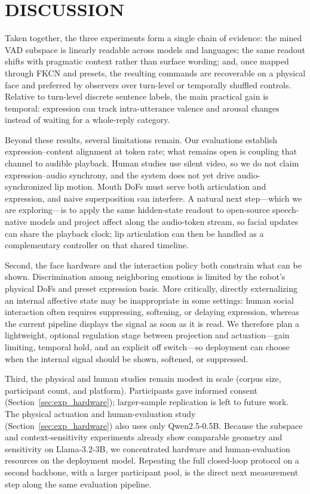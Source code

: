 \documentclass[letterpaper, 10 pt, conference]{ieeeconf/ieeeconf}
\begin{document}
\section{DISCUSSION}
\label{sec:discussion}

Taken together, the three experiments form a single chain of evidence: the mined VAD subspace is linearly readable across models and languages; the same readout shifts with pragmatic context rather than surface wording; and, once mapped through FKCN and presets, the resulting commands are recoverable on a physical face and preferred by observers over turn-level or temporally shuffled controls. Relative to turn-level discrete sentence labels, the main practical gain is temporal: expression can track intra-utterance valence and arousal changes instead of waiting for a whole-reply category.

Beyond these results, several limitations remain. Our evaluations establish expression--content alignment at token rate; what remains open is coupling that channel to audible playback. Human studies use silent video, so we do not claim expression--audio synchrony, and the system does not yet drive audio-synchronized lip motion. Mouth DoFs must serve both articulation and expression, and naive superposition can interfere. A natural next step---which we are exploring---is to apply the same hidden-state readout to open-source speech-native models and project affect along the audio-token stream, so facial updates can share the playback clock; lip articulation can then be handled as a complementary controller on that shared timeline.

Second, the face hardware and the interaction policy both constrain what can be shown. Discrimination among neighboring emotions is limited by the robot's physical DoFs and preset expression basis. More critically, directly externalizing an internal affective state may be inappropriate in some settings: human social interaction often requires suppressing, softening, or delaying expression, whereas the current pipeline displays the signal as soon as it is read. We therefore plan a lightweight, optional regulation stage between projection and actuation---gain limiting, temporal hold, and an explicit off switch---so deployment can choose when the internal signal should be shown, softened, or suppressed.

Third, the physical and human studies remain modest in scale (corpus size, participant count, and platform). Participants gave informed consent (Section~\ref{sec:exp_hardware}); larger-sample replication is left to future work. The physical actuation and human-evaluation study (Section~\ref{sec:exp_hardware}) also uses only Qwen2.5-0.5B. Because the subspace and context-sensitivity experiments already show comparable geometry and sensitivity on Llama-3.2-3B, we concentrated hardware and human-evaluation resources on the deployment model. Repeating the full closed-loop protocol on a second backbone, with a larger participant pool, is the direct next measurement step along the same evaluation pipeline.
\end{document}
